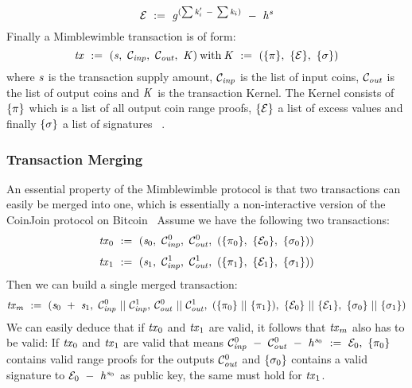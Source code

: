 \[ \mathcal{E} ~:=~ \mathit{g}^{(\sum{\mathit{k}'_i} ~-~ \sum{\mathit{k}_i})} ~-~ \mathit{h}^{\mathit{s}} \]
Finally a Mimblewimble transaction is of form:
\[ \mathit{tx} ~:=~ (\mathit{s} ,~ \mathcal{C}_{\mathit{inp}} ,~ \mathcal{C}_{\mathit{out}} ,~ \mathit{K})\:\text{with}\:\mathit{K} ~:=~ (\{\pi\} ,~ \{\mathcal{E}\} ,~ \{\sigma\}) \]
where $\mathit{s}$ is the transaction supply amount, $\mathcal{C}_{\mathit{inp}}$ is the list of input coins, $\mathcal{C}_{\mathit{out}}$ is the list of output coins and $\mathit{K}$ is the transaction Kernel. The Kernel consists of $\{\pi\}$
which is a list of all output coin range proofs, $\{\mathcal{E}\}$ a list of excess values and finally $\{\sigma\}$ a list of signatures ~\cite{fuchsbauer2019aggregate}. 

\subsubsection{Transaction Merging}
An essential property of the Mimblewimble protocol is that two transactions can easily be merged into one, which is essentially a non-interactive version of the CoinJoin protocol on Bitcoin~\cite{maxwell2013coinjoin}
Assume we have the following two transactions:
\[ \mathit{tx}_0 ~:=~ (\mathit{s}_0 ,~ \mathcal{C}_{\mathit{inp}}^0 ,~ \mathcal{C}_{\mathit{out}}^0 ,~ (\{\pi_0\} ,~ \{\mathcal{E}_0\} ,~ \{\sigma_0\}) ) \]
\[ \mathit{tx}_1 ~:=~ (\mathit{s}_1 ,~ \mathcal{C}_{\mathit{inp}}^1 ,~ \mathcal{C}_{\mathit{out}}^1 ,~ (\{\pi_1\} ,~ \{\mathcal{E}_1\} ,~ \{\sigma_1\}) ) \]
Then we can build a single merged transaction:
\[ \mathit{tx}_m ~:=~ (\mathit{s}_0 ~+~ \mathit{s}_1 ,~ \mathcal{C}_{\mathit{inp}}^0 ~||~ \mathcal{C}_{\mathit{inp}}^1,\:\mathcal{C}_{\mathit{out}}^0 ~||~ \mathcal{C}_{\mathit{out}}^1 ,~ (\{\pi_0\} ~||~ \{\pi_1\}) ,~
\{\mathcal{E}_0\} ~||~ \{\mathcal{E}_1\} ,~ \{\sigma_0\} ~||~ \{\sigma_1\}) \]
We can easily deduce that if $\mathit{tx}_0$ and $\mathit{tx}_1$ are valid, it follows that $\mathit{tx}_m$ also has to be valid:
If $\mathit{tx}_0$ and $\mathit{tx}_1$ are valid that means $\mathcal{C}_{\mathit{inp}}^0 ~-~ \mathcal{C}_{\mathit{out}}^0 ~-~ \mathit{h}^{\mathit{s}_0} ~:=~ \mathcal{E}_0 ,~ \{\pi_0\}$ contains valid range proofs for the outputs
$\mathcal{C}_{\mathit{out}}^0$ and $\{\sigma_0\}$ contains a valid signature to $\mathcal{E}_0 ~-~ \mathit{h}^{\mathit{s}_0}$ as public key, the same must hold for $\mathit{tx}_1$.

